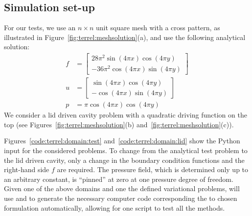 \subsection{Simulation set-up}

For our tests, we use an $n \times n$ unit square mesh with a cross
pattern, as illustrated in Figure~\ref{fig:terrel:meshsolution}(a),
and use the following analytical solution:
%
\begin{align}
\label{eqn:terrel:testcase}
  f &=
    \begin{bmatrix}
      28\pi^2\sin(4\pi x)\cos(4\pi y)
      \\
      -36\pi^2\cos(4\pi x)\sin(4\pi y)
    \end{bmatrix}
\\
  u &=
  \begin{bmatrix}
    \sin(4\pi x)\cos(4\pi y)
      \\
     -\cos(4\pi x)\sin(4\pi y)
   \end{bmatrix}
\\
  p &= \pi\cos(4\pi x)\cos(4\pi y)
\end{align}
%
We consider a lid driven cavity problem with a quadratic
driving function on the top (see Figures~\ref{fig:terrel:meshsolution}(b)
and~\ref{fig:terrel:meshsolution}(c)).

Figures~\ref{code:terrel:domain:test} and~\ref{code:terrel:domain:lid}
show the \dolfin{} Python input for the considered problems.  To change from
the analytical test problem to the lid driven cavity, only a change in
the boundary condition functions and the right-hand side $f$ are
required.  The pressure field, which is determined only up to an arbitrary
constant, is ``pinned'' at zero at one pressure degree of freedom.
Given one of the above domains and one the defined variational problems,
\dolfin{} will use \ffc{} and \fiat{} to generate the necessary computer
code corresponding the to chosen formulation automatically, allowing
for one script to test all the methods.

